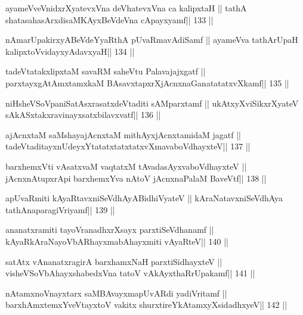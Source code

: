 \begin{shl}
ayameVveVnidxrXyatevxVna deVhatevxVna ca kalipxtaH ||
tathA shatasahasArxdisaMKAyxBeVdeVna cApayxyamf\hfill || 133 ||
\end{shl}

\begin{shl}
nAmarUpakirxyABeVdeYyaRthA pUvaRmavAdiSamf ||
ayameVva tathA\s rUpaH kalipxtoV\s vidayxyA\s davxyaH\hfill || 134 ||
\end{shl}

\begin{shl}
tadeVtatakxlipxtaM savaRM saheVtu Palavajajxgatf ||
parxtayxgAtAmxtamxkaM BAsavxtapxrXjAcnxnaGanatatatxvXkamf\hfill || 135 ||
\end{shl}

\begin{shl}
niHsheVSoVpaniSatAsxrasatxdeVtaditi sAMparxtamf ||
ukAtxyX\s\s viSikxrXyateV sAkASxtakxravinayxsatxbilavxvatf\hfill || 136 ||
\end{shl}

\begin{shl}
ajAcnxtaM saMshayajAcnxtaM mithAyxjAcnxtamidaM jagatf ||
tadeVtaditayxnUdeyxYtatatxtatxtatxvXmavaboVdhayxteV\hfill || 137 ||
\end{shl}

\begin{shl}
barxhemxVti vAsatxvaM vaqtatxM tAvadasAyxvaboVdhayxteV ||
jAcnxnAtupxrA\s pi barxhemxYva nAtoV jAcnxnaPalaM BaveVtf\hfill || 138 ||
\end{shl}

\begin{shl}
apUvaRmiti kAyaRtavxniSeVdhAyABidhiVyateV ||
kAraNatavxniSeVdhAya tathA\s naparagiVriyamf\hfill || 139 ||
\end{shl}

\begin{shl}
ananatxramiti tayoVranadhxrXsayx parxtiSeVdhanamf ||
kAyaRkAraNayoVbARhayxmabAhayxmiti vAyaRteV\hfill || 140 ||
\end{shl}

\begin{shl}
satAtx vA\s nanatxragirA barxhamxNaH parxtiSidhayxteV ||
visheVSoV\s bAhayxshabedxVna tatoV vAkAyxthaRrUpakamf\hfill || 141 ||
\end{shl}

\begin{shl}
nA\s\s tamxnoV\s nayxtarx saMBAvayxmapUvARdi yadiVritamf ||
barxhAmx\s\s temxYveVtayxtoV vakitx shurxtireYkAtamxyXsidadhxyeV\hfill || 142 ||
\end{shl}

